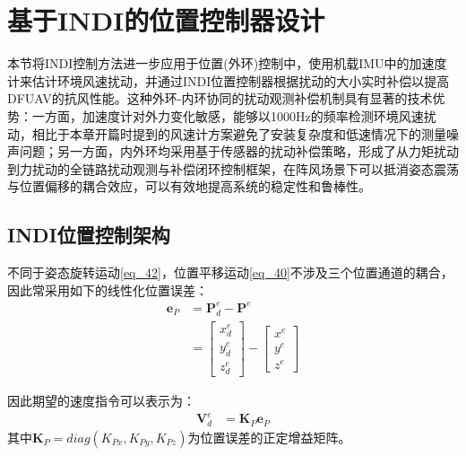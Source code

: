 \section{基于INDI的位置控制器设计}

本节将INDI控制方法进一步应用于位置(外环)控制中，使用机载IMU中的加速度计来估计环境风速扰动，并通过INDI位置控制器根据扰动的大小实时补偿以提高DFUAV的抗风性能。这种外环-内环协同的扰动观测补偿机制具有显著的技术优势：一方面，加速度计对外力变化敏感，能够以1000Hz的频率检测环境风速扰动，相比于本章开篇时提到的风速计方案避免了安装复杂度和低速情况下的测量噪声问题；另一方面，内外环均采用基于传感器的扰动补偿策略，形成了从力矩扰动到力扰动的全链路扰动观测与补偿闭环控制框架，在阵风场景下可以抵消姿态震荡与位置偏移的耦合效应，可以有效地提高系统的稳定性和鲁棒性。

\subsection{INDI位置控制架构}

不同于姿态旋转运动\eqref{eq_42}，位置平移运动\eqref{eq_40}不涉及三个位置通道的耦合，因此常采用如下的线性化位置误差：
\begin{equation}
    \begin{aligned}
        \boldsymbol{e}_P&=\boldsymbol{P}^e_d-\boldsymbol{P}^e\\
        &=\begin{bmatrix}x_d^e \\y_d^e \\z_d^e\end{bmatrix}-\begin{bmatrix}x^e \\y^e \\z^e\end{bmatrix}
    \end{aligned}
    \label{4_7}
\end{equation}

因此期望的速度指令可以表示为：
\begin{equation}
    \begin{aligned}
        \boldsymbol{V}_d^e&=\boldsymbol{K}_P\boldsymbol{e}_P
    \end{aligned}
    \label{4_8}
\end{equation}
其中$\boldsymbol{K}_P=diag({K}_{Px},{K}_{Py},{K}_{Pz})$为位置误差的正定增益矩阵。


